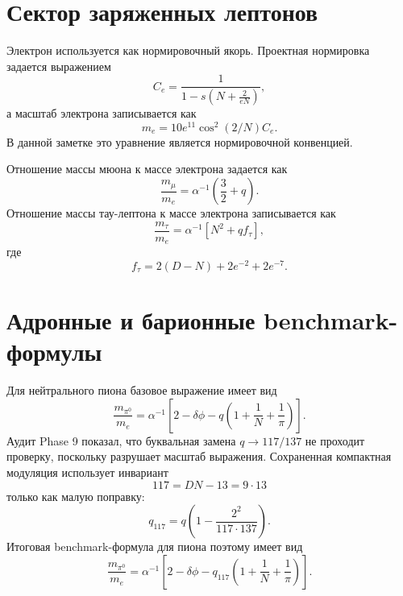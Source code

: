 \documentclass[11pt]{article}
\begin{document}
\section{Сектор заряженных лептонов}

Электрон используется как нормировочный якорь. Проектная нормировка задается
выражением
\begin{equation}
    C_e=\frac{1}{1-s\left(N+\frac{2}{eN}\right)},
\end{equation}
а масштаб электрона записывается как
\begin{equation}
    m_e = 10e^{11}\cos^2(2/N)C_e .
\end{equation}
В данной заметке это уравнение является нормировочной конвенцией.

Отношение массы мюона к массе электрона задается как
\begin{equation}
    \frac{m_\mu}{m_e}
    =
    \alpha^{-1}\left(\frac{3}{2}+q\right).
\end{equation}
Отношение массы тау-лептона к массе электрона записывается как
\begin{equation}
    \frac{m_\tau}{m_e}
    =
    \alpha^{-1}\left[N^2+qf_\tau\right],
\end{equation}
где
\begin{equation}
    f_\tau = 2(D-N)+2e^{-2}+2e^{-7}.
\end{equation}

\section{Адронные и барионные benchmark-формулы}

Для нейтрального пиона базовое выражение имеет вид
\begin{equation}
    \frac{m_{\pi^0}}{m_e}
    =
    \alpha^{-1}
    \left[
        2-\delta\phi
        -
        q\left(1+\frac{1}{N}+\frac{1}{\pi}\right)
    \right].
\end{equation}
Аудит Phase 9 показал, что буквальная замена $q\rightarrow117/137$ не проходит
проверку, поскольку разрушает масштаб выражения. Сохраненная компактная
модуляция использует инвариант
\begin{equation}
    117=DN-13=9\cdot13
\end{equation}
только как малую поправку:
\begin{equation}
    q_{117}=q\left(1-\frac{2^2}{117\cdot137}\right).
\end{equation}
Итоговая benchmark-формула для пиона поэтому имеет вид
\begin{equation}
    \frac{m_{\pi^0}}{m_e}
    =
    \alpha^{-1}
    \left[
        2-\delta\phi
        -
        q_{117}\left(1+\frac{1}{N}+\frac{1}{\pi}\right)
    \right].
\end{equation}
\end{document}
